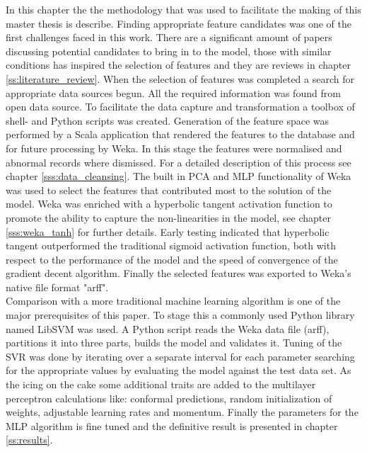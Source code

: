 In this chapter the the methodology that was used to facilitate the making of this master thesis is describe. 
Finding appropriate feature candidates was one of the first challenges faced in this work. There are a significant amount of papers discussing potential candidates to bring in to the model, those with similar conditions has inspired the selection of features and they are reviews in chapter \ref{ss:literature_review}. When the selection of features was completed a search for appropriate data sources begun. All the required information was found from open data source. To facilitate the data capture and transformation a toolbox of shell- and Python scripts was created. Generation of the feature space was performed by a Scala application that rendered the features to the database and for future processing by Weka. In this stage the features were normalised and abnormal records where dismissed. For a detailed description of this process see chapter \ref{sss:data_cleansing}. The built in PCA and MLP functionality of Weka was used to select the features that contributed most to the solution of the model. Weka was enriched with a hyperbolic tangent activation function to promote the ability to capture the non-linearities in the model, see chapter \ref{sss:weka_tanh} for further details. Early testing indicated that hyperbolic tangent outperformed the traditional sigmoid activation function, both with respect to the performance of the model and the speed of convergence of the gradient decent algorithm. Finally the selected features was exported to Weka's native file format "arff".
\\
Comparison with a more traditional machine learning algorithm is one of the major prerequisites of this paper. To stage this a commonly used Python library named LibSVM was used. A Python script reads the Weka data file (arff), partitions it into three parts, builds the model and validates it. Tuning of the SVR was done by iterating over a separate interval for each parameter searching for the appropriate values by evaluating the model against the test data set. As the icing on the cake some additional traits are added to the multilayer perceptron calculations like: conformal predictions, random initialization of weights, adjustable learning rates and momentum. Finally the parameters for the MLP algorithm is fine tuned and the definitive result is presented in chapter \ref{ss:results}.  
\\

